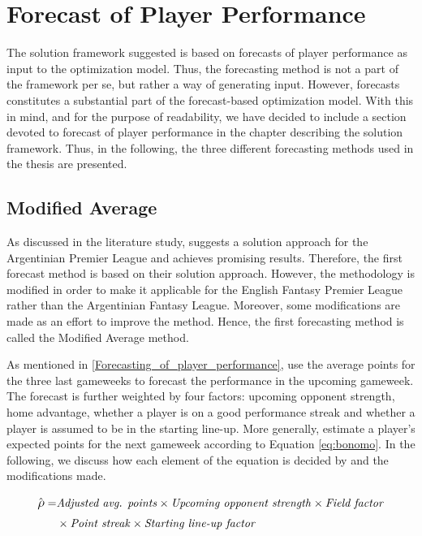 \section{Forecast of Player Performance} \label{Player_Performance}

The solution framework suggested is based on forecasts of player performance as input to the optimization model. Thus, the forecasting method is not a part of the framework per se, but rather a way of generating input. However, forecasts constitutes a substantial part of the forecast-based optimization model. With this in mind, and for the purpose of readability, we have decided to include a section devoted to forecast of player performance in the chapter describing the solution framework. Thus, in the following, the three different forecasting methods used in the thesis are presented. 

\subsection{Modified Average} \label{Sol_approach_Modified_Average}

As discussed in the literature study, \cite{Bonomo} suggests a solution approach for the Argentinian Premier League and achieves promising results. Therefore, the first forecast method is based on their solution approach. However, the methodology is modified in order to make it applicable for the English Fantasy Premier League rather than the Argentinian Fantasy League. Moreover, some modifications are made as an effort to improve the method. Hence, the first forecasting method is called the Modified Average method.

\newpar

As mentioned in \ref{Forecasting_of_player_performance}, \cite{Bonomo} use the average points for the three last gameweeks to forecast the performance in the upcoming gameweek. The forecast is further weighted by four factors: upcoming opponent strength, home advantage, whether a player is on a good performance streak and whether a player is assumed to be in the starting line-up. More generally, \cite{Bonomo} estimate a player's expected points for the next gameweek according to Equation \ref{eq:bonomo}. In the following, we discuss how each element of the equation is decided by \cite{Bonomo} and the modifications made.

\begin{equation}
\begin{split}
    \hat{\rho}  = & \textrm{\textit{Adjusted avg. points}} \times \textrm{\textit{Upcoming opponent strength}} \times \textrm{\textit{Field factor}} \\
        & \times \textrm{\textit{Point streak}} \times \textrm{\textit{Starting line-up factor}}
\end{split}
\label{eq:bonomo}
\end{equation}

